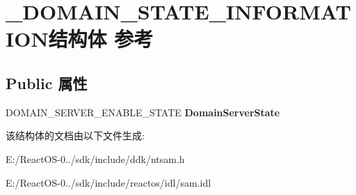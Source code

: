 \hypertarget{struct___d_o_m_a_i_n___s_t_a_t_e___i_n_f_o_r_m_a_t_i_o_n}{}\section{\+\_\+\+D\+O\+M\+A\+I\+N\+\_\+\+S\+T\+A\+T\+E\+\_\+\+I\+N\+F\+O\+R\+M\+A\+T\+I\+O\+N结构体 参考}
\label{struct___d_o_m_a_i_n___s_t_a_t_e___i_n_f_o_r_m_a_t_i_o_n}
\subsection*{Public 属性}
\begin{DoxyCompactItemize}
\item 
\mbox{\label{struct___d_o_m_a_i_n___s_t_a_t_e___i_n_f_o_r_m_a_t_i_o_n_a5eb51c5f6dff66d15a977d20604fc786}} 
D\+O\+M\+A\+I\+N\+\_\+\+S\+E\+R\+V\+E\+R\+\_\+\+E\+N\+A\+B\+L\+E\+\_\+\+S\+T\+A\+TE {\bfseries Domain\+Server\+State}
\end{DoxyCompactItemize}


该结构体的文档由以下文件生成\+:\begin{DoxyCompactItemize}
\item 
E\+:/\+React\+O\+S-\/0../sdk/include/ddk/ntsam.\+h\item 
E\+:/\+React\+O\+S-\/0../sdk/include/reactos/idl/sam.\+idl\end{DoxyCompactItemize}
